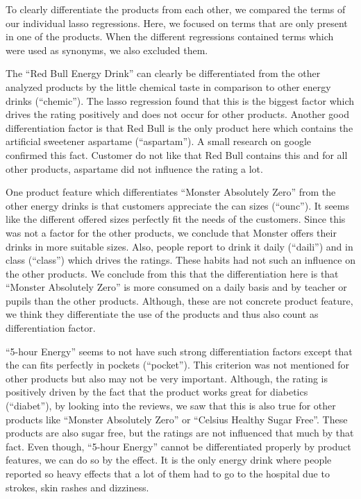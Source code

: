 \documentclass[
]{article}
\begin{document}
To clearly differentiate the products from each other, we compared the
terms of our individual lasso regressions. Here, we focused on terms
that are only present in one of the products. When the different
regressions contained terms which were used as synonyms, we also
excluded them.

The ``Red Bull Energy Drink'' can clearly be differentiated from the
other analyzed products by the little chemical taste in comparison to
other energy drinks (``chemic''). The lasso regression found that this
is the biggest factor which drives the rating positively and does not
occur for other products. Another good differentiation factor is that
Red Bull is the only product here which contains the artificial
sweetener aspartame (``aspartam''). A small research on google confirmed
this fact. Customer do not like that Red Bull contains this and for all
other products, aspartame did not influence the rating a lot.

One product feature which differentiates ``Monster Absolutely Zero''
from the other energy drinks is that customers appreciate the can sizes
(``ounc''). It seems like the different offered sizes perfectly fit the
needs of the customers. Since this was not a factor for the other
products, we conclude that Monster offers their drinks in more suitable
sizes. Also, people report to drink it daily (``daili'') and in class
(``class'') which drives the ratings. These habits had not such an
influence on the other products. We conclude from this that the
differentiation here is that ``Monster Absolutely Zero'' is more
consumed on a daily basis and by teacher or pupils than the other
products. Although, these are not concrete product feature, we think
they differentiate the use of the products and thus also count as
differentiation factor.

``5-hour Energy'' seems to not have such strong differentiation factors
except that the can fits perfectly in pockets (``pocket''). This
criterion was not mentioned for other products but also may not be very
important. Although, the rating is positively driven by the fact that
the product works great for diabetics (``diabet''), by looking into the
reviews, we saw that this is also true for other products like ``Monster
Absolutely Zero'' or ``Celsius Healthy Sugar Free''. These products are
also sugar free, but the ratings are not influenced that much by that
fact. Even though, ``5-hour Energy'' cannot be differentiated properly
by product features, we can do so by the effect. It is the only energy
drink where people reported so heavy effects that a lot of them had to
go to the hospital due to strokes, skin rashes and dizziness.
\end{document}
